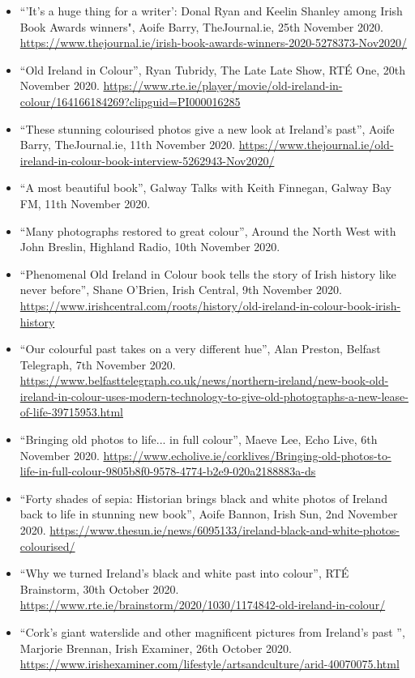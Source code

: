 \documentclass[10pt,a4paper]{res} %
\begin{document}
\begin{resume}
{\begin{itemize}
\item ``'It's a huge thing for a writer': Donal Ryan and Keelin Shanley among Irish Book Awards winners", Aoife Barry, TheJournal.ie, 25th November 2020. \url{https://www.thejournal.ie/irish-book-awards-winners-2020-5278373-Nov2020/}
\item ``Old Ireland in Colour'', Ryan Tubridy, The Late Late Show, RT\'{E} One, 20th November 2020. \url{https://www.rte.ie/player/movie/old-ireland-in-colour/164166184269?clipguid=PI000016285}
\item ``These stunning colourised photos give a new look at Ireland's past'', Aoife Barry, TheJournal.ie, 11th November 2020. \url{https://www.thejournal.ie/old-ireland-in-colour-book-interview-5262943-Nov2020/}
\item ``A most beautiful book'', Galway Talks with Keith Finnegan, Galway Bay FM, 11th November 2020.
\item ``Many photographs restored to great colour'', Around the North West with John Breslin, Highland Radio, 10th November 2020.
\item ``Phenomenal Old Ireland in Colour book tells the story of Irish history like never before'', Shane O'Brien, Irish Central, 9th November 2020. \url{https://www.irishcentral.com/roots/history/old-ireland-in-colour-book-irish-history}
\item ``Our colourful past takes on a very different hue'', Alan Preston, Belfast Telegraph, 7th November 2020. \url{https://www.belfasttelegraph.co.uk/news/northern-ireland/new-book-old-ireland-in-colour-uses-modern-technology-to-give-old-photographs-a-new-lease-of-life-39715953.html}
\item ``Bringing old photos to life... in full colour'', Maeve Lee, Echo Live, 6th November 2020. \url{https://www.echolive.ie/corklives/Bringing-old-photos-to-life-in-full-colour-9805b8f0-9578-4774-b2e9-020a2188883a-ds}
\item ``Forty shades of sepia: Historian brings black and white photos of Ireland back to life in stunning new book'', Aoife Bannon, Irish Sun, 2nd November 2020. \url{https://www.thesun.ie/news/6095133/ireland-black-and-white-photos-colourised/}
\item ``Why we turned Ireland's black and white past into colour'', RT\'{E} Brainstorm, 30th October 2020. \url{https://www.rte.ie/brainstorm/2020/1030/1174842-old-ireland-in-colour/}
\item ``Cork's giant waterslide and other magnificent pictures from Ireland's past '', Marjorie Brennan, Irish Examiner, 26th October 2020. \url{https://www.irishexaminer.com/lifestyle/artsandculture/arid-40070075.html}

\end{itemize}}
\end{resume}
\end{document}
